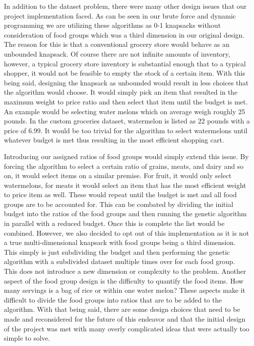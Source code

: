 \documentclass[10pt,journal,compsoc]{IEEEtran}
\begin{document}
In addition to the dataset problem, there were many other design issues that our
project implementation faced. As can be seen in our brute force and dynamic
programming we are utilizing these algorithms as 0-1 knapsacks without
consideration of food groups which was a third dimension in our original design.
The reason for this is that a conventional grocery store would behave as an
unbounded knapsack. Of course there are not infinite amounts of inventory,
however, a typical grocery store inventory is substantial enough that to a
typical shopper, it would not be feasible to empty the stock of a certain item.
With this being said, designing the knapsack as unbounded would result in less
choices that the algorithm would choose. It would simply pick an item that
resulted in the maximum weight to price ratio and then select that item until
the budget is met. An example would be selecting water melons which on average
weigh roughly 25 pounds. In the custom groceries dataset, watermelon is listed
as 22 pounds with a price of 6.99. It would be too trivial for the algorithm to
select watermelons until whatever budget is met thus resulting in the most
efficient shopping cart.

Introducing our assigned ratios of food groups would simply extend this issue.
By forcing the algorithm to select a certain ratio of grains, meats, and dairy
and so on, it would select items on a similar premise. For fruit, it would only
select watermelons, for meats it would select an item that has the most
efficient weight to price item as well. These would repeat until the budget is
met and all food groups are to be accounted for. This can be combated by
dividing the initial budget into the ratios of the food groups and then running
the genetic algorithm in parallel with a reduced budget. Once this is complete
the list would be combined. However, we also decided to opt out of this
implementation as it is not a true multi-dimensional knapsack with food groups
being a third dimension. This simply is just subdividing the budget and then
performing the genetic algorithm with a subdivided dataset multiple times over
for each food group. This does not introduce a new dimension or complexity to
the problem. Another aspect of the food group design is the difficulty to
quantify the food items. How many servings is a bag of rice or within one water
melon? These aspects make it difficult to divide the food groups into ratios
that are to be added to the algorithm. With that being said, there are some
design choices that need to be made and reconsidered for the future of this
endeavor and that the initial design of the project was met with many overly
complicated ideas that were actually too simple to solve. 
\end{document}
